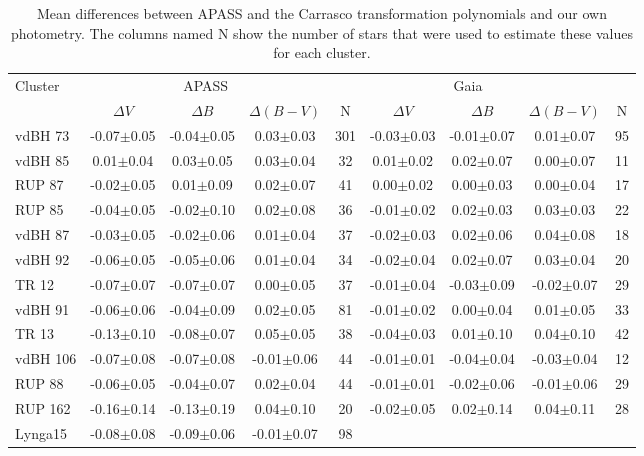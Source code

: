 \documentclass[draft]{aa}
\begin{document}
\begin{table*}[ht]
    \centering
\caption{Mean differences between APASS and the Carrasco transformation
polynomials and our own photometry. The columns named N show the
number of stars that were used to estimate these values for each cluster.}
    \begin{tabular}{lcccc|cccc}
    \hline \hline 
Cluster & \multicolumn{3}{c}{APASS} & \multicolumn{4}{c}{Gaia}\\
 & $\Delta V$ & $\Delta B$ & $\Delta (B-V)$ & N & $\Delta V$ &
$\Delta B$ & $\Delta (B-V)$ & N\\
    \hline
vdBH 73   & -0.07$\pm$0.05 & -0.04$\pm$0.05 & 0.03$\pm$0.03 & 301 &
-0.03$\pm$0.03 & -0.01$\pm$0.07 & 0.01$\pm$0.07 & 95\\
vdBH 85   & 0.01$\pm$0.04 & 0.03$\pm$0.05 & 0.03$\pm$0.04 & 32 &
0.01$\pm$0.02 & 0.02$\pm$0.07 & 0.00$\pm$0.07 & 11\\
RUP 87    & -0.02$\pm$0.05 & 0.01$\pm$0.09 & 0.02$\pm$0.07 & 41 &
0.00$\pm$0.02 & 0.00$\pm$0.03 & 0.00$\pm$0.04 & 17\\
RUP 85    & -0.04$\pm$0.05 & -0.02$\pm$0.10 & 0.02$\pm$0.08 & 36 &
-0.01$\pm$0.02 & 0.02$\pm$0.03 & 0.03$\pm$0.03 & 22\\
vdBH 87   & -0.03$\pm$0.05 & -0.02$\pm$0.06 & 0.01$\pm$0.04 & 37 &
-0.02$\pm$0.03 & 0.02$\pm$0.06 & 0.04$\pm$0.08 & 18\\
vdBH 92   & -0.06$\pm$0.05 & -0.05$\pm$0.06 & 0.01$\pm$0.04 & 34 &
-0.02$\pm$0.04 & 0.02$\pm$0.07 & 0.03$\pm$0.04 & 20\\
TR 12     & -0.07$\pm$0.07 & -0.07$\pm$0.07 & 0.00$\pm$0.05 & 37 &
-0.01$\pm$0.04 & -0.03$\pm$0.09 & -0.02$\pm$0.07 & 29\\
vdBH 91   & -0.06$\pm$0.06 & -0.04$\pm$0.09 & 0.02$\pm$0.05 & 81 &
-0.01$\pm$0.02 & 0.00$\pm$0.04 & 0.01$\pm$0.05 & 33\\
TR 13     & -0.13$\pm$0.10 & -0.08$\pm$0.07 & 0.05$\pm$0.05 & 38 &
-0.04$\pm$0.03 & 0.01$\pm$0.10 & 0.04$\pm$0.10 & 42\\
vdBH 106  & -0.07$\pm$0.08 & -0.07$\pm$0.08 & -0.01$\pm$0.06 & 44 &
-0.01$\pm$0.01 & -0.04$\pm$0.04 & -0.03$\pm$0.04 & 12\\
RUP 88    & -0.06$\pm$0.05 & -0.04$\pm$0.07 & 0.02$\pm$0.04 & 44 &
-0.01$\pm$0.01 & -0.02$\pm$0.06 & -0.01$\pm$0.06 & 29\\
RUP 162   & -0.16$\pm$0.14 & -0.13$\pm$0.19 & 0.04$\pm$0.10 & 20 &
-0.02$\pm$0.05 & 0.02$\pm$0.14 & 0.04$\pm$0.11 & 28\\
Lynga15   & -0.08$\pm$0.08 & -0.09$\pm$0.06 & -0.01$\pm$0.07 & 98 &

\end{tabular}
\end{table*}
\end{document}
